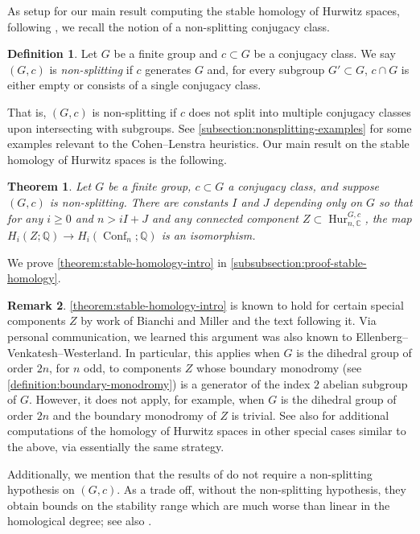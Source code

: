\documentclass[12 pt]{amsart}
\theoremstyle{plain}
\newtheorem{theorem}[subsubsection]{Theorem}
\theoremstyle{definition}
\newtheorem{definition}[theorem]{Definition}
\newtheorem{remark}[theorem]{Remark}
\theoremstyle{remark}
\numberwithin{equation}{section}
\DeclareMathOperator\conf{Conf}
\newcommand{\phur}[4]{\operatorname{Hur}^{#1, #3}_{#2,#4}}
\begin{document}
As setup for our main result computing the stable homology of Hurwitz spaces, following
\cite[Definition 3.1]{EllenbergVW:cohenLenstra},
we recall the notion of a non-splitting conjugacy class.
\begin{definition}
	\label{definition:nonsplitting}
	Let $G$ be a finite group and $c \subset G$ be a conjugacy
	class. We say $(G, c)$ is {\em non-splitting} if $c$ generates
$G$ and, for every subgroup $G' \subset G$, $c \cap G$ is either empty or
consists of a single conjugacy class.
\end{definition}

That is, $(G, c)$ is non-splitting if $c$ does not split into multiple conjugacy classes upon intersecting
with subgroups.
See \autoref{subsection:nonsplitting-examples} for some examples relevant to the
Cohen--Lenstra heuristics.
Our main result on the stable homology of Hurwitz spaces is the following.

\begin{theorem}
	\label{theorem:stable-homology-intro}
	Let $G$ be a finite group, $c \subset G$ a conjugacy class, and suppose
	$(G,c)$ is non-splitting.
	There are constants $I$ and $J$ depending only on $G$ so that for 
	any $i \geq 0$ and
	$n > iI + J$ and any connected component $Z \subset \phur G n c {\mathbb
	C}$, the map $H_i(Z; \mathbb Q) \to H_i(\conf_{n}; \mathbb Q)$
	is an isomorphism.
\end{theorem}
We prove
\autoref{theorem:stable-homology-intro} in
\autoref{subsubsection:proof-stable-homology}.

\begin{remark}
	\label{remark:}
	\autoref{theorem:stable-homology-intro} is known to hold for certain special
	components $Z$ by work of Bianchi and Miller
	\cite[Corollary C']{bianchiM:polynomial-stability} and the text
	following it.
	Via personal communication, we learned this argument was also known to
	Ellenberg--Venkatesh--Westerland.
	In particular, this applies when $G$ is the dihedral group of order
	$2n$, for $n$ odd, to components $Z$ whose boundary monodromy
	(see \autoref{definition:boundary-monodromy}) is a generator of the
	index $2$ abelian subgroup of $G$.
	However, it does not apply, for example, when $G$ is the dihedral group
	of order $2n$ and the boundary monodromy of $Z$ is trivial.
	See also \cite[\S6]{tietz:thesis} for additional computations of the
	homology of Hurwitz spaces in other special cases similar to the above, via essentially
	the same strategy.


	Additionally, we mention that the results of 
	\cite[Corollary C']{bianchiM:polynomial-stability} do not require 
	a non-splitting hypothesis on $(G,c)$. As a trade off, without the
	non-splitting hypothesis, they obtain bounds on the stability range
	which are much worse than linear in the homological degree;
	see also \cite[\S1.2]{bianchiM:polynomial-stability}.
\end{remark}
\end{document}
